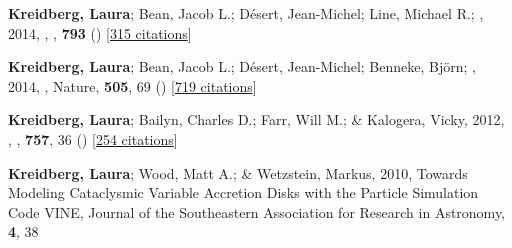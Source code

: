 \item[{\color{numcolor}\scriptsize4}] \textbf{Kreidberg, Laura}; Bean, Jacob L.; D{\'e}sert, Jean-Michel; Line, Michael R.; \etal, 2014, , \apj, \textbf{793} () [\href{https://ui.adsabs.harvard.edu/abs/2014ApJ...793L..27K}{315 citations}]

\item[{\color{numcolor}\scriptsize3}] \textbf{Kreidberg, Laura}; Bean, Jacob L.; D{\'e}sert, Jean-Michel; Benneke, Bj{\"o}rn; \etal, 2014, , Nature, \textbf{505}, 69 () [\href{https://ui.adsabs.harvard.edu/abs/2014Natur.505...69K}{719 citations}]

\item[{\color{numcolor}\scriptsize2}] \textbf{Kreidberg, Laura}; Bailyn, Charles D.; Farr, Will M.; \& Kalogera, Vicky, 2012, , \apj, \textbf{757}, 36 () [\href{https://ui.adsabs.harvard.edu/abs/2012ApJ...757...36K}{254 citations}]

\item[{\color{numcolor}\scriptsize1}] \textbf{Kreidberg, Laura}; Wood, Matt A.; \& Wetzstein, Markus, 2010, Towards Modeling Cataclysmic Variable Accretion Disks with the Particle Simulation Code VINE, Journal of the Southeastern Association for Research in Astronomy, \textbf{4}, 38